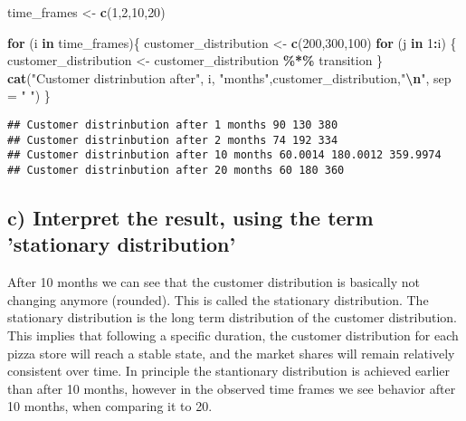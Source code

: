 \documentclass[
]{article}
\newenvironment{Shaded}{\begin{snugshade}}{\end{snugshade}}
\newcommand{\AttributeTok}[1]{\textcolor[rgb]{0.13,0.29,0.53}{#1}}
\newcommand{\ControlFlowTok}[1]{\textcolor[rgb]{0.13,0.29,0.53}{\textbf{#1}}}
\newcommand{\DecValTok}[1]{\textcolor[rgb]{0.00,0.00,0.81}{#1}}
\newcommand{\FunctionTok}[1]{\textcolor[rgb]{0.13,0.29,0.53}{\textbf{#1}}}
\newcommand{\NormalTok}[1]{#1}
\newcommand{\OtherTok}[1]{\textcolor[rgb]{0.56,0.35,0.01}{#1}}
\newcommand{\SpecialCharTok}[1]{\textcolor[rgb]{0.81,0.36,0.00}{\textbf{#1}}}
\newcommand{\StringTok}[1]{\textcolor[rgb]{0.31,0.60,0.02}{#1}}
\begin{document}
\begin{Shaded}
\begin{Highlighting}[]
\NormalTok{time\_frames }\OtherTok{\textless{}{-}} \FunctionTok{c}\NormalTok{(}\DecValTok{1}\NormalTok{,}\DecValTok{2}\NormalTok{,}\DecValTok{10}\NormalTok{,}\DecValTok{20}\NormalTok{)}

\ControlFlowTok{for}\NormalTok{ (i }\ControlFlowTok{in}\NormalTok{ time\_frames)\{}
\NormalTok{    customer\_distribution }\OtherTok{\textless{}{-}} \FunctionTok{c}\NormalTok{(}\DecValTok{200}\NormalTok{,}\DecValTok{300}\NormalTok{,}\DecValTok{100}\NormalTok{)}
    \ControlFlowTok{for}\NormalTok{ (j }\ControlFlowTok{in} \DecValTok{1}\SpecialCharTok{:}\NormalTok{i) \{}
\NormalTok{        customer\_distribution }\OtherTok{\textless{}{-}}\NormalTok{ customer\_distribution }\SpecialCharTok{\%*\%}\NormalTok{ transition}
\NormalTok{    \}}
    \FunctionTok{cat}\NormalTok{(}\StringTok{"Customer distrinbution after"}\NormalTok{, i, }\StringTok{"months"}\NormalTok{,customer\_distribution,}\StringTok{"}\SpecialCharTok{\textbackslash{}n}\StringTok{"}\NormalTok{, }\AttributeTok{sep =} \StringTok{" "}\NormalTok{)}
\NormalTok{\}}
\end{Highlighting}
\end{Shaded}

\begin{verbatim}
## Customer distrinbution after 1 months 90 130 380 
## Customer distrinbution after 2 months 74 192 334 
## Customer distrinbution after 10 months 60.0014 180.0012 359.9974 
## Customer distrinbution after 20 months 60 180 360
\end{verbatim}

\hypertarget{c-interpret-the-result-using-the-term-stationary-distribution}{%
\subsection{c) Interpret the result, using the term 'stationary
distribution'}\label{c-interpret-the-result-using-the-term-stationary-distribution}}

After 10 months we can see that the customer distribution is basically
not changing anymore (rounded). This is called the stationary
distribution. The stationary distribution is the long term distribution
of the customer distribution. This implies that following a specific
duration, the customer distribution for each pizza store will reach a
stable state, and the market shares will remain relatively consistent
over time. In principle the stantionary distribution is achieved earlier
than after 10 months, however in the observed time frames we see
behavior after 10 months, when comparing it to 20.
\end{document}
